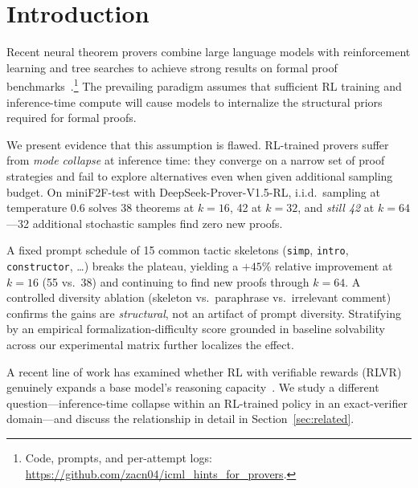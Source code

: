 \documentclass{article}
\begin{document}
\section{Introduction}

Recent neural theorem provers combine large language models with reinforcement learning and tree searches to achieve strong results on formal proof benchmarks~\cite{xin2024deepseek, chen2025seed, trinh2024solving, lin2025goedel}.\footnote{Code, prompts, and per-attempt logs: \url{https://github.com/zacn04/icml_hints_for_provers}.} The prevailing paradigm assumes that sufficient RL training and inference-time compute will cause models to internalize the structural priors required for formal proofs.

We present evidence that this assumption is flawed. RL-trained provers suffer from \emph{mode collapse} at inference time: they converge on a narrow set of proof strategies and fail to explore alternatives even when given additional sampling budget. On miniF2F-test with DeepSeek-Prover-V1.5-RL, i.i.d.\ sampling at temperature 0.6 solves 38 theorems at $k{=}16$, 42 at $k{=}32$, and \emph{still 42} at $k{=}64$---32 additional stochastic samples find zero new proofs.

A fixed prompt schedule of 15 common tactic skeletons (\texttt{simp}, \texttt{intro}, \texttt{constructor}, \dots) breaks the plateau, yielding a $+45\%$ relative improvement at $k{=}16$ (55 vs.\ 38) and continuing to find new proofs through $k{=}64$. A controlled diversity ablation (skeleton vs.\ paraphrase vs.\ irrelevant comment) confirms the gains are \emph{structural}, not an artifact of prompt diversity. Stratifying by an empirical formalization-difficulty score grounded in baseline solvability across our experimental matrix further localizes the effect.

A recent line of work has examined whether RL with verifiable rewards (RLVR) genuinely expands a base model's reasoning capacity~\cite{yue2025rlvr, wu2025invisibleleash}. We study a different question---inference-time collapse within an RL-trained policy in an exact-verifier domain---and discuss the relationship in detail in Section~\ref{sec:related}.
\end{document}
